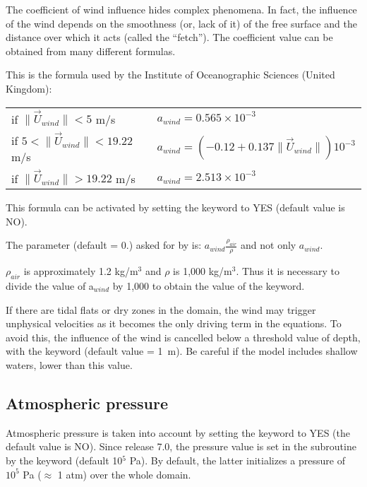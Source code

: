 The coefficient of wind influence hides complex phenomena.
In fact, the influence of the wind depends on the smoothness (or, lack of it)
of the free surface and the distance over which it acts (called the ``fetch'').
The coefficient value can be obtained from many different formulas.

This is the formula used by the Institute of Oceanographic Sciences
(United Kingdom):


\begin{tabular}{ll}

if $\| \vec{U}_{wind} \| < 5$ m/s & $a_{wind}  = 0.565 \times 10^{-3}$ \\
if $5 < \| \vec{U}_{wind} \| < 19.22$ m/s &
 $a_{wind} = (- 0.12 + 0.137 \| \vec{U}_{wind} \| ) 10^{-3}$ \\
if $\| \vec{U}_{wind} \| > 19.22$ m/s & $a_{wind} = 2.513 \times 10^{-3}$ \\
\end{tabular}


This formula can be activated by setting the keyword
 to YES
(default value is NO).

The parameter  (default = 0.)
asked for by  is:
$a_{wind} \frac{\rho_{air}}{\rho}$ and not only $a_{wind}$.

$\rho_{air}$ is approximately 1.2 kg/m$^3$ and $\rho$ is 1,000 kg/m$^3$.
Thus it is necessary to divide the value of a$_{wind}$ by 1,000
to obtain the value of the  keyword.

If there are tidal flats or dry zones in the domain, the wind may trigger
unphysical velocities as it becomes the only driving term in the equations.
To avoid this, the influence of the wind is cancelled below a threshold value
of depth, with the keyword 
(default value = 1~m).
Be careful if the model includes shallow waters, lower than this value.

\subsection{Atmospheric pressure}

Atmospheric pressure is taken into account by setting the keyword
 to YES (the default value is NO).
Since release 7.0, the pressure value is set in the 
subroutine by the keyword 
(default 10$^5$ Pa).
By default, the latter initializes a pressure of $10^5$ Pa ($\approx$ 1 atm)
over the whole domain.

